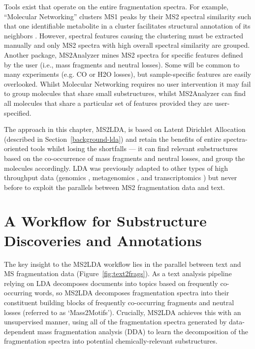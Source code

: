 Tools exist that operate on the entire fragmentation spectra. For example, “Molecular Networking” clusters MS1 peaks by their MS2 spectral similarity such that one identifiable metabolite in a cluster facilitates structural annotation of its neighbors \cite{yang2013molecular, van2016urinary}.  However, spectral features causing the clustering must be extracted manually and only MS2 spectra with high overall spectral similarity are grouped. Another package, MS2Analyzer \cite{ma2014ms2analyzer} mines MS2 spectra for specific features defined by the user (i.e., mass fragments and neutral losses). Some will be common to many experiments (e.g. CO or H2O losses), but sample-specific features are easily overlooked. Whilst Molecular Networking requires no user intervention it may fail to group molecules that share small substructures, whilst MS2Analyzer can find all molecules that share a particular set of features provided they are user-specified. 

The approach in this chapter, MS2LDA, is based on Latent Dirichlet Allocation (described in Section~\ref{background-lda}) and retain the benefits of entire spectra-oriented tools whilst losing the shortfalls --- it can find relevant substructures based on the co-occurrence of mass fragments and neutral losses, and group the molecules accordingly. LDA was previously adapted to other types of high throughput data (genomics \cite{chen2010probabilistic}, metagenomics \cite{zhang2015exploiting}, and transcriptomics \cite{rogers2005latent}) but never before to exploit the parallels between MS2 fragmentation data and text.

\section{A Workflow for Substructure Discoveries and Annotations}

The key insight to the MS2LDA workflow lies in the parallel between text and MS fragmentation data (Figure~\ref{fig:text2frags}). As a text analysis pipeline relying on LDA decomposes documents into topics based on frequently co-occurring words, so MS2LDA decomposes fragmentation spectra into their constituent building blocks of frequently co-occurring fragments and neutral losses (referred to as ‘Mass2Motifs’). Crucially, MS2LDA achieves this with an unsupervised manner, using all of the fragmentation spectra generated by data-dependent mass fragmentation analysis (DDA) to learn the decomposition of the fragmentation spectra into potential chemically-relevant substructures. 

